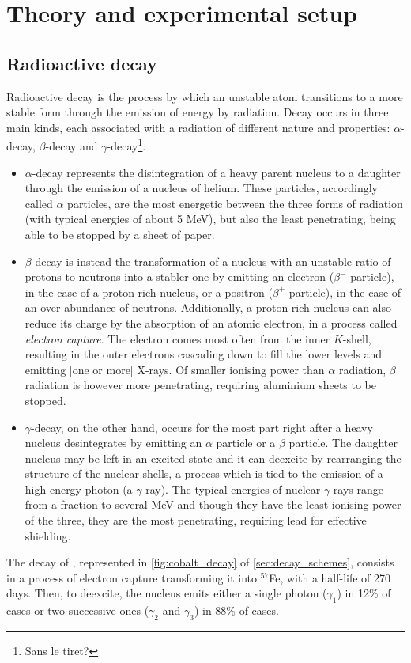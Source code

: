 \section{Theory and experimental setup}
\subsection{Radioactive decay}
\label{sec:radioactivity}

Radioactive decay is the process by which an unstable atom transitions to a more stable form through the emission of energy by radiation.
Decay occurs in three main kinds, each associated with a radiation of different nature and properties: $\alpha$-decay, $\beta$-decay and $\gamma$-decay\footnote{Sans le tiret?}.
\begin{itemize}
    \item $\alpha$-decay represents the disintegration of a heavy parent nucleus to a daughter through the emission of a nucleus of helium.
    These particles, accordingly called $\alpha$ particles, are the most energetic between the three forms of radiation (with typical energies of about 5 MeV), but also the least penetrating, being able to be stopped by a sheet of paper.
    \item $\beta$-decay is instead the transformation of a nucleus with an unstable ratio of protons to neutrons into a stabler one by emitting an electron ($\beta^-$ particle), in the case of a proton-rich nucleus, or a positron ($\beta^+$ particle), in the case of an over-abundance of neutrons.
    Additionally, a proton-rich nucleus can also reduce its charge by the absorption of an atomic electron, in a process called \emph{electron capture}.
    The electron comes most often from the inner $K$-shell, resulting in the outer electrons cascading down to fill the lower levels and emitting [one or more] X-rays\cite{intro_nuclear_particle_physics}.
    Of smaller ionising power than $\alpha$ radiation, $\beta$ radiation is however more penetrating, requiring aluminium sheets to be stopped.
    \item $\gamma$-decay, on the other hand, occurs for the most part right after a heavy nucleus desintegrates by emitting an $\alpha$ particle or a $\beta$ particle.
    The daughter nucleus may be left in an excited state and it can deexcite by rearranging the structure of the nuclear shells, 
    a process which is tied to the emission of a high-energy photon (a $\gamma$ ray).
    The typical energies of nuclear $\gamma$ rays range from a fraction to several MeV 
    and though they have the least ionising power of the three, they are the most penetrating, requiring lead for effective shielding.
\end{itemize}
The decay of \cobalt, represented in \autoref{fig:cobalt_decay} 
of \autoref{sec:decay_schemes}, consists in a process of electron capture transforming it into $^{57}$Fe, with a half-life of 270 days.
Then, to deexcite, the nucleus emits 
either a single photon ($\gamma_1$) in 12\% of cases
or two successive ones ($\gamma_2$ and $\gamma_3$) in 88\% of cases.


